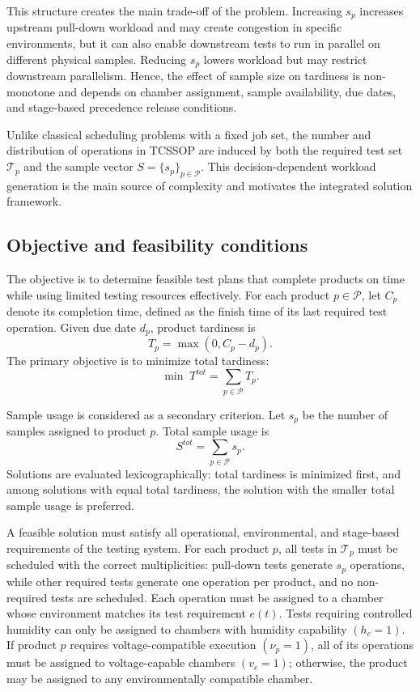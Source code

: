 This structure creates the main trade-off of the problem. Increasing \(s_p\) increases upstream pull-down workload and may create congestion in specific environments, but it can also enable downstream tests to run in parallel on different physical samples. Reducing \(s_p\) lowers workload but may restrict downstream parallelism. Hence, the effect of sample size on tardiness is non-monotone and depends on chamber assignment, sample availability, due dates, and stage-based precedence release conditions.

Unlike classical scheduling problems with a fixed job set, the number and distribution of operations in TCSSOP are induced by both the required test set \(\mathcal{T}_p\) and the sample vector \(S=\{s_p\}_{p\in\mathcal{P}}\). This decision-dependent workload generation is the main source of complexity and motivates the integrated solution framework.

\subsection{Objective and feasibility conditions}
\label{subsec:objective_feasibility}

The objective is to determine feasible test plans that complete products on time while using limited testing resources effectively. For each product \(p\in\mathcal{P}\), let \(C_p\) denote its completion time, defined as the finish time of its last required test operation. Given due date \(d_p\), product tardiness is
\[
T_p=\max(0,C_p-d_p).
\]
The primary objective is to minimize total tardiness:
\[
\min \; T^{tot}=\sum_{p\in\mathcal{P}}T_p.
\]

Sample usage is considered as a secondary criterion. Let \(s_p\) be the number of samples assigned to product \(p\). Total sample usage is
\[
S^{tot}=\sum_{p\in\mathcal{P}}s_p.
\]
Solutions are evaluated lexicographically: total tardiness is minimized first, and among solutions with equal total tardiness, the solution with the smaller total sample usage is preferred.

A feasible solution must satisfy all operational, environmental, and stage-based requirements of the testing system. For each product \(p\), all tests in \(\mathcal{T}_p\) must be scheduled with the correct multiplicities: pull-down tests generate \(s_p\) operations, while other required tests generate one operation per product, and no non-required tests are scheduled. Each operation must be assigned to a chamber whose environment matches its test requirement \(e(t)\). Tests requiring controlled humidity can only be assigned to chambers with humidity capability \((h_c=1)\). If product \(p\) requires voltage-compatible execution \((\nu_p=1)\), all of its operations must be assigned to voltage-capable chambers \((v_c=1)\); otherwise, the product may be assigned to any environmentally compatible chamber.

